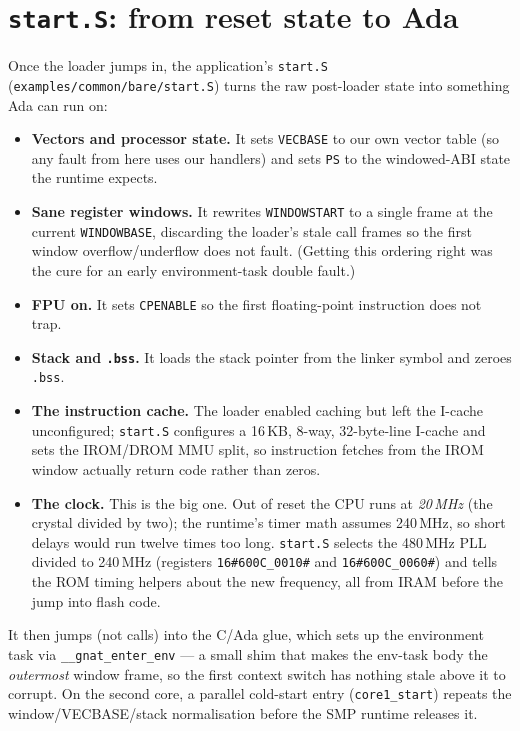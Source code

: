 \section{\texttt{start.S}: from reset state to Ada}

Once the loader jumps in, the application's \texttt{start.S}
(\texttt{examples/common/bare/start.S}) turns the raw post-loader state into
something Ada can run on:

\begin{itemize}
\item \textbf{Vectors and processor state.} It sets \texttt{VECBASE} to our own
  vector table (so any fault from here uses our handlers) and sets \texttt{PS} to
  the windowed-ABI state the runtime expects.
\item \textbf{Sane register windows.} It rewrites \texttt{WINDOWSTART} to a single
  frame at the current \texttt{WINDOWBASE}, discarding the loader's stale call
  frames so the first window overflow/underflow does not fault. (Getting this
  ordering right was the cure for an early environment-task double fault.)
\item \textbf{FPU on.} It sets \texttt{CPENABLE} so the first floating-point
  instruction does not trap.
\item \textbf{Stack and \texttt{.bss}.} It loads the stack pointer from the
  linker symbol and zeroes \texttt{.bss}.
\item \textbf{The instruction cache.} The loader enabled caching but left the
  I-cache unconfigured; \texttt{start.S} configures a 16\,KB, 8-way, 32-byte-line
  I-cache and sets the IROM/DROM MMU split, so instruction fetches from the IROM
  window actually return code rather than zeros.
\item \textbf{The clock.} This is the big one. Out of reset the CPU runs at
  \emph{20\,MHz} (the crystal divided by two); the runtime's timer math assumes
  240\,MHz, so short delays would run twelve times too long. \texttt{start.S}
  selects the 480\,MHz PLL divided to 240\,MHz (registers
  \texttt{16\#600C\_0010\#} and \texttt{16\#600C\_0060\#}) and tells the ROM timing
  helpers about the new frequency, all from IRAM before the jump into flash code.
\end{itemize}

It then jumps (not calls) into the C/Ada glue, which sets up the environment task
via \texttt{\_\_gnat\_enter\_env} --- a small shim that makes the env-task body the
\emph{outermost} window frame, so the first context switch has nothing stale
above it to corrupt. On the second core, a parallel cold-start entry
(\texttt{core1\_start}) repeats the window/VECBASE/stack normalisation before the
SMP runtime releases it.

